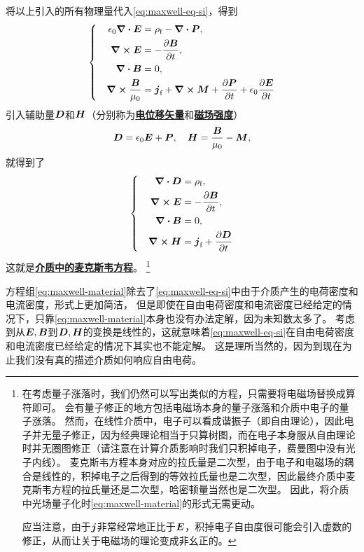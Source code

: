 \documentclass[UTF8, a4paper]{ctexart}
\newcommand*{\concept}[1]{\underline{\textbf{#1}}}
\newenvironment{bigcase}{\left\{\quad\begin{aligned}}{\end{aligned}\right.}
\begin{document}
将以上引入的所有物理量代入\eqref{eq:maxwell-eq-si}，得到
\[
    \begin{bigcase}
        \epsilon_0 \div{\vb*{E}} &= \rho_\text{f} - \div{\vb*{P}}, \\
        \curl{\vb*{E}} &= - \pdv{\vb*{B}}{t}, \\
        \div{\vb*{B}} &= 0, \\
        \curl{\frac{\vb*{B}}{\mu_0}} &= \vb*{j}_\text{f} + \curl{\vb*{M}} + \pdv{\vb*{P}}{t} + \epsilon_0 \pdv{\vb*{E}}{t}
    \end{bigcase}
\]
引入辅助量$\vb*{D}$和$\vb*{H}$（分别称为\concept{电位移矢量}和\concept{磁场强度}）
\begin{equation}
    \vb*{D} = \epsilon_0 \vb*{E} + \vb*{P}, \quad \vb*{H} = \frac{\vb*{B}}{\mu_0} - \vb*{M},
\end{equation}
就得到了
\begin{equation}
    \begin{bigcase}
        \div{\vb*{D}} &= \rho_\text{f}, \\
        \curl{\vb*{E}} &= - \pdv{\vb*{B}}{t}, \\
        \div{\vb*{B}} &= 0, \\
        \curl{\vb*{H}} &= \vb*{j}_\text{f} + \pdv{\vb*{D}}{t}
    \end{bigcase}
    \label{eq:maxwell-material}
\end{equation}
这就是\concept{介质中的麦克斯韦方程}。%
\footnote{
    在考虑量子涨落时，我们仍然可以写出类似的方程，只需要将电磁场替换成算符即可。
    会有量子修正的地方包括电磁场本身的量子涨落和介质中电子的量子涨落。
    然而，在线性介质中，电子可以看成谐振子（即自由理论），因此电子并无量子修正，因为经典理论相当于只算树图，而在电子本身服从自由理论时并无圈图修正（请注意在计算介质影响时我们只积掉电子，费曼图中没有光子内线）。
    麦克斯韦方程本身对应的拉氏量是二次型，由于电子和电磁场的耦合是线性的，积掉电子之后得到的等效拉氏量也是二次型，因此最终介质中麦克斯韦方程的拉氏量还是二次型，哈密顿量当然也是二次型。
    因此，将介质中光场量子化时\eqref{eq:maxwell-material}的形式无需更动。

    应当注意，由于$\vb*{j}$非常经常地正比于$\vb*{E}$，积掉电子自由度很可能会引入虚数的修正，从而让关于电磁场的理论变成非幺正的。
}%

方程组\eqref{eq:maxwell-material}除去了\eqref{eq:maxwell-eq-si}中由于介质产生的电荷密度和电流密度，形式上更加简洁，
但是即使在自由电荷密度和电流密度已经给定的情况下，只靠\eqref{eq:maxwell-material}本身也没有办法定解，因为未知数太多了。
考虑到从$\vb*{E}, \vb*{B}$到$\vb*{D}, \vb*{H}$的变换是线性的，这就意味着\eqref{eq:maxwell-eq-si}在自由电荷密度和电流密度已经给定的情况下其实也不能定解。
这是理所当然的，因为到现在为止我们没有真的描述介质如何响应自由电荷。
\end{document}
